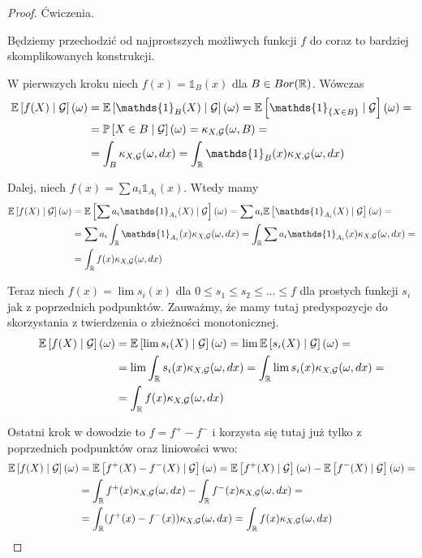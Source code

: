 \begin{proof}
  Ćwiczenia.

  Będziemy przechodzić od najprostszych możliwych funkcji $f$ do coraz to bardziej skomplikowanych konstrukcji.

  W pierwszych kroku niech $f(x)=\mathds{1}_B(x)$ dla $B\in Bor(\operatorname{\mathbb{R}})$. Wówczas 
  \begin{align*}
  \expected{f(X)}{\set{G}}(\omega)&=\expected{\mathds{1}_B(X)}{\set{G}}(\omega)=\expected{\mathds{1}_{\{X\in B\}}}{\set{G}}(\omega)=\\ 
                                  &=\prob{X\in B}{\set{G}}(\omega)=\kappa_{X,\set{G}}(\omega, B)=\\ 
                                  &=\int_B\kappa_{X,\set{G}}(\omega, dx)=\int_{\R} \mathds{1}_B(x)\kappa_{X,\set{G}}(\omega, dx)
  \end{align*} 

  Dalej, niech $f(x)=\sum a_i\mathds{1}_{A_i}(x)$. Wtedy mamy
  \begin{align*}
    \expected{f(X)}{\set{G}}(\omega)&=\expected{\sum a_i\mathds{1}_{A_i}(X)}{\set{G}}(\omega)=\sum a_i\expected{\mathds{1}_{A_i}(X)}{\set{G}}(\omega)=\\ 
                                    &=\sum a_i\int_{\R}\mathds{1}_{A_i}(x)\kappa_{X,\set{G}}(\omega, dx)=\int_{\R}\sum a_i\mathds{1}_{A_i}(x)\kappa_{X,\set{G}}(\omega, dx)=\\ 
                                    &=\int_{\R}f(x)\kappa_{X,\set{G}}(\omega, dx)
  \end{align*}

  Teraz niech $f(x)=\lim s_i(x)$ dla $0\leq s_1\leq s_2\leq...\leq f$ dla prostych funkcji $s_i$ jak z poprzednich podpunktów. Zauważmy, że mamy tutaj predyspozycje do skorzystania z twierdzenia o zbieżności monotonicznej.
  \begin{align*}
    \expected{f(X)}{\set{G}}(\omega)&=\expected{\lim s_i(X)}{\set{G}}(\omega)=\lim\expected{s_i(X)}{\set{G}}(\omega)=\\ 
                            &=\lim \int_{\R} s_i(x)\kappa_{X,\set{G}}(\omega, dx)=\int_{\R}\lim s_i(x)\kappa_{X,\set{G}}(\omega, dx)=\\ 
                            &=\int_{\R}f(x)\kappa_{X,\set{G}}(\omega, dx)
  \end{align*}

  Ostatni krok w dowodzie to $f=f^+-f^-$ i korzysta się tutaj już tylko z poprzednich podpunktów oraz liniowości wwo:
  \begin{align*}
    \expected{f(X)}{\set{G}}(\omega)&=\expected{f^+(X)-f^-(X)}{\set{G}}(\omega)=\expected{f^+(X)}{\set{G}}(\omega)-\expected{f^-(X)}{\set{G}}(\omega)=\\ 
                            &=\int_{\R}f^+(x)\kappa_{X,\set{G}}(\omega, dx)-\int_{\R}f^-(x)\kappa_{X,\set{G}}(\omega, dx)=\\ 
                            &=\int_{\R}(f^+(x)-f^-(x))\kappa_{X,\set{G}}(\omega, dx)=\int_{\R}f(x)\kappa_{X,\set{G}}(\omega, dx)
  \end{align*}
\end{proof}

